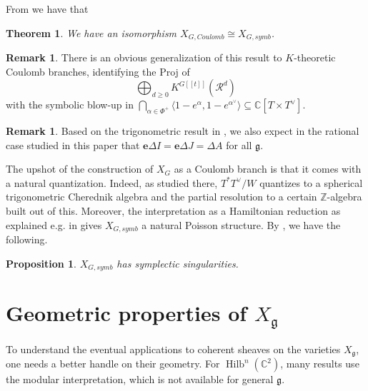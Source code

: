 \documentclass{amsart}
\numberwithin{equation}{section}
\newtheorem{theorem}[lemma]{Theorem}%
\newtheorem{proposition}[lemma]{Proposition}%
\theoremstyle{definition}
\newtheorem{remark}[lemma]{Remark}%
\DeclareMathOperator{\Hilb}{Hilb}
\newcommand{\cR}{\mathcal{R}}
\newcommand{\fg}{\mathfrak{g}}
\newcommand{\C}{{\mathbb C}}
\newcommand{\Z}{{\mathbb Z}}
\newcommand{\e}{\mathbf{e}}
\begin{document}
From \cite[Theorem 3.8.]{GKO} we have that
\begin{theorem}
We have an isomorphism $X_{G,Coulomb}\cong X_{G,symb}$.
\end{theorem}
\begin{remark}
    There is an obvious generalization of this result to $K$-theoretic Coulomb branches, identifying the Proj of $$\bigoplus_{d\geq 0} K^{G[[t]]}(\cR^d)$$ with the symbolic blow-up in $\bigcap_{\alpha\in \Phi^+} \langle 1-e^{\alpha},1-e^{\alpha^\vee}\rangle\subseteq \C[T\times T^\vee]$.
\end{remark}
\begin{remark}
Based on the trigonometric result in \cite[Theorem 3.6]{GKO}, we also expect in the rational case studied in this paper that
$\e \Delta I=\e \Delta J=\Delta A$ for all $\fg$. 

\end{remark}


The upshot of the construction of $X_G$ as a Coulomb branch is that it comes with a natural quantization. Indeed, as studied there, $T^*T^\vee/W$ quantizes to a spherical trigonometric Cherednik algebra and the partial resolution to a certain $\Z$-algebra built out of this. Moreover, the interpretation as a Hamiltonian reduction as explained e.g. in \cite[Remark 5]{Weekes} gives $X_{G,symb}$ a natural Poisson structure. By \cite[Theorem 1.1. and Lemma 2.1.]{BellamySymplectic}, we have the following.
\begin{proposition}
\label{prop:sympsingtrig}
$X_{G,symb}$ has symplectic singularities.
\end{proposition}


\section{Geometric properties of $X_\fg$}
\label{sec:geomprop}
To understand the eventual applications to coherent sheaves on the varieties $X_{\fg}$, one needs a better handle on their geometry. For $\Hilb^n(\C^2)$, many results use the modular interpretation, which is not available for general $\fg$.
\end{document}
